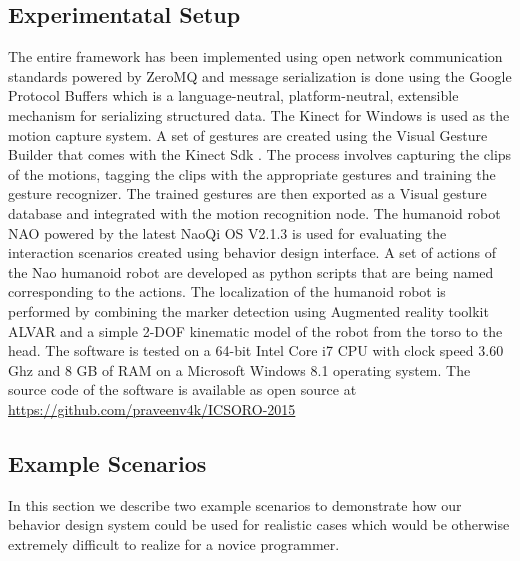 \documentclass{llncs}
\begin{document}
\subsection{Experimentatal Setup}
The entire framework has been implemented using open network communication standards powered by ZeroMQ \cite{ZeroMQ} and message serialization is done using the Google Protocol Buffers \cite{ProtocolBuffers} which is a language-neutral, platform-neutral, extensible mechanism for serializing structured data. The Kinect for Windows is used as the motion capture system. A set of gestures are created using the Visual Gesture Builder that comes with the Kinect Sdk \cite{Kinect2014}. The process involves capturing the clips of the motions, tagging the clips with the appropriate gestures and training the gesture recognizer. The trained gestures are then exported as a Visual gesture database and integrated with the motion recognition node. The humanoid robot NAO powered by the latest NaoQi OS V2.1.3 is used for evaluating the interaction scenarios created using behavior design interface.  A set of actions of the Nao humanoid robot are developed as python scripts that are being named corresponding to the actions. The localization of the humanoid robot is performed by combining the marker detection using Augmented reality toolkit ALVAR \cite{ALVAR} and a simple 2-DOF kinematic model of the robot from the torso to the head. The software is tested on a 64-bit Intel Core i7 CPU with clock speed 3.60 Ghz and 8 GB of RAM on a  Microsoft Windows 8.1 operating system. The source code of the software is available as open source at \url{https://github.com/praveenv4k/ICSORO-2015}
\subsection{Example Scenarios}

In this section we describe two example scenarios to demonstrate how our behavior design system could be used for realistic cases which would be otherwise extremely difficult to realize for a novice programmer.
\end{document}
